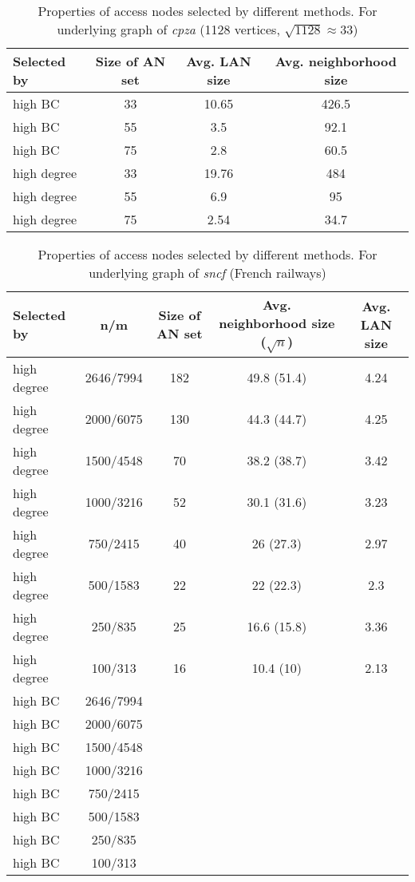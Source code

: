 	\begin{table}[h!]{
		\scriptsize
	    \begin{tabular}{l|c|c|c}
		\hline
			\rowcolor{tablehead}
	           	\textbf{Selected by} & 
	           	\textbf{Size of AN set} &
	           	\textbf{Avg. LAN size} &
	           	\textbf{Avg. neighborhood size} \\
	        \hline
			high BC & 33 & 10.65 & 426.5 \\
			high BC & 55 & 3.5 & 92.1 \\
			high BC & 75 & 2.8 & 60.5 \\
			high degree & 33 & 19.76 & 484 \\
			high degree & 55 & 6.9 & 95 \\
			high degree & 75 & 2.54 & 34.7 \\
	        \end{tabular}}
		\caption{\label{tab:accnodesza} Properties of access nodes selected by different methods. For underlying graph of \textit{cpza} (1128 vertices, $\sqrt{1128} \approx 33$)}
	        \normalsize
	\end{table}
	
	\begin{table}[h!]{
		\scriptsize
	    \begin{tabular}{l|c|c|c|c}
		\hline
			\rowcolor{tablehead}
	           	\textbf{Selected by} & 
	           	\textbf{n/m} &
	           	\textbf{Size of AN set} &
	           	\textbf{Avg. neighborhood size} ($\sqrt{n}$) &
	           	\textbf{Avg. LAN size} \\
	        \hline
			high degree & 2646/7994 & 182 & 49.8 (51.4) & 4.24 \\
			high degree & 2000/6075 & 130 & 44.3 (44.7) & 4.25 \\
			high degree & 1500/4548 & 70 & 38.2 (38.7) & 3.42 \\
			high degree & 1000/3216 & 52 & 30.1 (31.6) & 3.23 \\
			high degree & 750/2415 & 40 & 26 (27.3) & 2.97 \\
			high degree & 500/1583 & 22 & 22 (22.3) & 2.3 \\
			high degree & 250/835 & 25 & 16.6 (15.8) & 3.36 \\
			high degree & 100/313 & 16 & 10.4 (10) & 2.13 \\
			high BC & 2646/7994 &  &  &  \\
			high BC & 2000/6075 &  &  &  \\
			high BC & 1500/4548 &  &  &  \\
			high BC & 1000/3216 &  &  &  \\
			high BC & 750/2415 &  &  &  \\
			high BC & 500/1583 &  &  &  \\
			high BC & 250/835 &  &  &  \\
			high BC & 100/313 &  &  &  \\
	        \end{tabular}}
		\caption{\label{tab:accnodessncf} Properties of access nodes selected by different methods. For underlying graph of \textit{sncf} (French railways)}
	        \normalsize
	\end{table}
	
